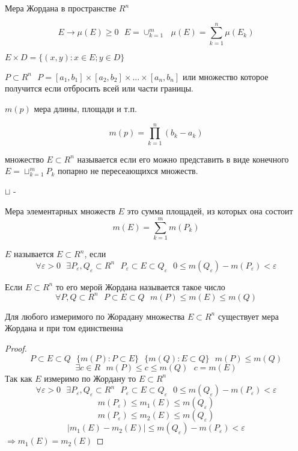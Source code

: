 \begin{title}[\Large]
  Мера Жордана в пространстве $R^n$
\end{title}

  $$
  E \to \mu (E) \ge 0 ~~~
  E = \cup_{k=1}^m ~~~
  \mu(E) = \sum_{k=1}^n \mu (E_k)
  $$

   $E \times D = \{ (x,y): x \in E; y \in D \}$

  $P \subset R^n ~~~ P = [a_1, b_1] \times [a_2, b_2] \times \ldots \times
  [a_n, b_n]$ или множество которое получится если отбросить всей или части
  границы.

  $m(p)$ мера длины, площади и т.п.

  $$
  m(p) = \prod_{k=1}^n (b_k - a_k)
  $$

  множество $E \subset R^n$ называется 
  если его можно представить в виде конечного $E = \sqcup_{k=1}^m P_k$ попарно
  не пересеающихся множеств.

  $\sqcup$ - 

Мера элементарных множеств $E$ это сумма площадей, из которых она состоит
$$
m(E) = \sum_{k=1}^m m(P_k)
$$

\begin{defin}
  $E$ называется  $E \subset R^n$, если
  $$
  \forall \varepsilon > 0 ~~~
  \exists P_{\varepsilon}, Q_{\varepsilon} \subset R^n ~~~
  P_{\varepsilon} \subset E \subset Q_{\varepsilon} ~~~
  0 \le m(Q_{\varepsilon}) - m(P_{\varepsilon}) < \varepsilon
  $$

  Если $E \subset R^n$ то его мерой Жордана называется такое число
  $$
  \forall P,Q \subset R^n ~~~
  P \subset E \subset Q ~~~
  m(P) \le m(E) \le m(Q)
  $$
\end{defin}

\begin{theorem}
  Для любого измеримого по Жорадану множества $E \subset R^n$ существует мера
  Жордана и при том единственна
\end{theorem}

\begin{proof}
  $$
  P \subset E \subset Q ~~~
  \{ m(P): P \subset E \} ~~~
  \{ m(Q): E \subset Q \} ~~~
  m(P) \le m(Q)
  $$
  $$
  \exists c \in R ~~~
  m(P) \le c \le m(Q) ~~~
  c = m(E)
  $$
  Так как $E$ измеримо по Жордану то $E \subset R^n$
  $$
  \forall \varepsilon > 0 ~~~
  \exists P_{\varepsilon},Q_{\varepsilon} \subset R^n ~~~
  P_{\varepsilon} \subset E \subset Q_{\varepsilon} ~~~
  0 \le m(Q_{\varepsilon}) - m(P_\varepsilon) < \varepsilon
  $$
  $$
  m(P_{\varepsilon}) \le m_1 (E) \le m(Q_{\varepsilon})
  $$
  $$
  m(P_{\varepsilon}) \le m_2 (E) \le m(Q_{\varepsilon})
  $$
  $$
  |m_1 (E) - m_2 (E)| \le m(Q_{\varepsilon}) - m(P_{\varepsilon}) < \varepsilon
  $$
  $\Rightarrow m_1(E) = m_2(E)$
\end{proof}

